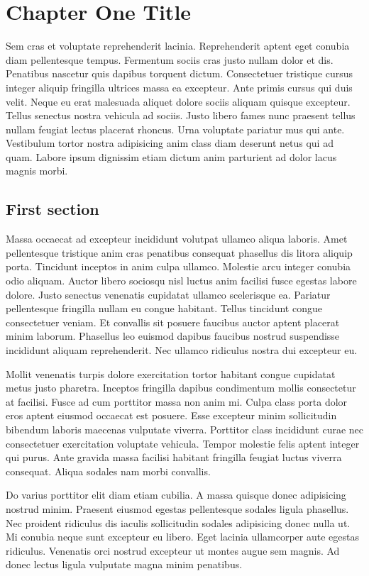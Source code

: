 \chapter{Chapter One Title}

Sem cras et voluptate reprehenderit lacinia. Reprehenderit aptent eget conubia diam pellentesque tempus. Fermentum sociis cras justo nullam dolor et dis. Penatibus nascetur quis dapibus torquent dictum. Consectetuer tristique cursus integer aliquip fringilla ultrices massa ea excepteur. Ante primis cursus qui duis velit. Neque eu erat malesuada aliquet dolore sociis aliquam quisque excepteur.
Tellus senectus nostra vehicula ad sociis. Justo libero fames nunc praesent tellus nullam feugiat lectus placerat rhoncus. Urna voluptate pariatur mus qui ante. Vestibulum tortor nostra adipisicing anim class diam deserunt netus qui ad quam. Labore ipsum dignissim etiam dictum anim parturient ad dolor lacus magnis morbi.

\section{First section}
Massa occaecat ad excepteur incididunt volutpat ullamco aliqua laboris. Amet pellentesque tristique anim cras penatibus consequat phasellus dis litora aliquip porta. Tincidunt inceptos in anim culpa ullamco. Molestie arcu integer conubia odio aliquam. Auctor libero sociosqu nisl luctus anim facilisi fusce egestas labore dolore. Justo senectus venenatis cupidatat ullamco scelerisque ea. Pariatur pellentesque fringilla nullam eu congue habitant. Tellus tincidunt congue consectetuer veniam. Et convallis sit posuere faucibus auctor aptent placerat minim laborum. Phasellus leo euismod dapibus faucibus nostrud suspendisse incididunt aliquam reprehenderit. Nec ullamco ridiculus nostra dui excepteur eu.

Mollit venenatis turpis dolore exercitation tortor habitant congue cupidatat metus justo pharetra. Inceptos fringilla dapibus condimentum mollis consectetur at facilisi. Fusce ad cum porttitor massa non anim mi. Culpa class porta dolor eros aptent eiusmod occaecat est posuere. Esse excepteur minim sollicitudin bibendum laboris maecenas vulputate viverra. Porttitor class incididunt curae nec consectetuer exercitation voluptate vehicula. Tempor molestie felis aptent integer qui purus. Ante gravida massa facilisi habitant fringilla feugiat luctus viverra consequat. Aliqua sodales nam morbi convallis.

Do varius porttitor elit diam etiam cubilia. A massa quisque donec adipisicing nostrud minim. Praesent eiusmod egestas pellentesque sodales ligula phasellus. Nec proident ridiculus dis iaculis sollicitudin sodales adipisicing donec nulla ut. Mi conubia neque sunt excepteur eu libero. Eget lacinia ullamcorper aute egestas ridiculus. Venenatis orci nostrud excepteur ut montes augue sem magnis. Ad donec lectus ligula vulputate magna minim penatibus.

